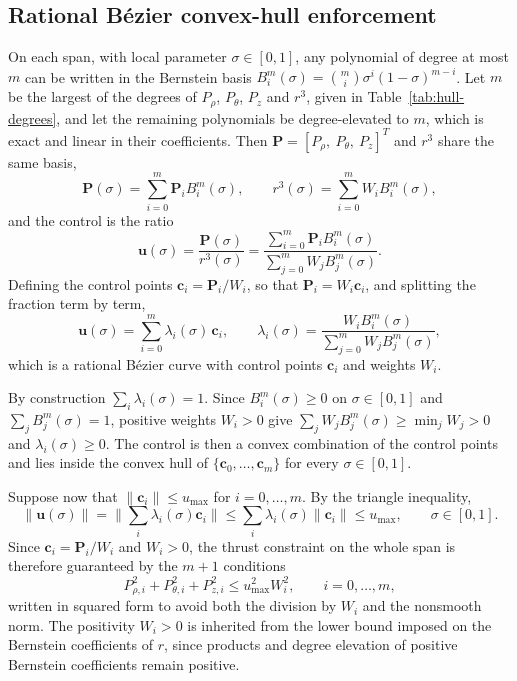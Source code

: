 \documentclass[a4paper,fleqn]{cas-sc}
\begin{document}
\subsection{Rational B\'ezier convex-hull enforcement}
\label{sec:hull}

On each span, with local parameter $\sigma\in[0,1]$, any polynomial of degree
at most $m$ can be written in the Bernstein basis
$B^m_i(\sigma)=\binom{m}{i}\sigma^i(1-\sigma)^{m-i}$. Let $m$ be the largest
of the degrees of $P_\rho$, $P_\theta$, $P_z$ and $r^3$, given in
Table~\ref{tab:hull-degrees}, and let the remaining polynomials be
degree-elevated to $m$, which is exact and linear in their coefficients.
Then $\mathbf{P}=[P_{\rho},\>P_{\theta},\>P_z]^T$ and $r^3$ share the same
basis,
\begin{equation}
	\mathbf{P}(\sigma)=\sum^{m}_{i=0}\mathbf{P}_i B^m_i(\sigma),\qquad
	r^3(\sigma)=\sum^{m}_{i=0}W_i B^m_i(\sigma),
\end{equation}
and the control is the ratio
\begin{equation}
	\mathbf{u}(\sigma)=\dfrac{\mathbf{P}(\sigma)}{r^3(\sigma)}
	=\dfrac{\sum\limits^{m}_{i=0}\mathbf{P}_i B^m_i(\sigma)}
	{\sum\limits^{m}_{j=0}W_j B^m_j(\sigma)}.
\end{equation}
Defining the control points $\mathbf{c}_i=\mathbf{P}_i/W_i$, so that
$\mathbf{P}_i=W_i\mathbf{c}_i$, and splitting the fraction term by term,
\begin{equation}
	\mathbf{u}(\sigma)
	=\sum^{m}_{i=0}\lambda_i(\sigma)\,\mathbf{c}_i,
	\qquad
	\lambda_i(\sigma)=\dfrac{W_i B^m_i(\sigma)}
	{\sum\limits^{m}_{j=0}W_j B^m_j(\sigma)},
	\label{eq:rational-bezier}
\end{equation}
which is a rational B\'ezier curve with control points $\mathbf{c}_i$ and
weights $W_i$.

By construction $\sum_i\lambda_i(\sigma)=1$. Since $B^m_i(\sigma)\geq 0$ on
$\sigma\in[0,1]$ and $\sum_j B^m_j(\sigma)=1$, positive weights $W_i>0$ give
$\sum_j W_jB^m_j(\sigma)\geq\min_j W_j>0$ and $\lambda_i(\sigma)\geq 0$.
The control is then a convex combination of the control points and lies
inside the convex hull of $\{\mathbf{c}_0,\ldots,\mathbf{c}_m\}$ for every
$\sigma\in[0,1]$.

Suppose now that $\lVert\mathbf{c}_i\rVert\leq u_{\max}$ for
$i=0,\ldots,m$. By the triangle inequality,
\begin{equation*}
	\lVert\mathbf{u}(\sigma)\rVert
	=\Big\lVert\sum_i\lambda_i(\sigma)\mathbf{c}_i\Big\rVert
	\leq\sum_i\lambda_i(\sigma)\lVert\mathbf{c}_i\rVert
	\leq u_{\max},
	\qquad \sigma\in[0,1].
\end{equation*}
Since $\mathbf{c}_i=\mathbf{P}_i/W_i$ and $W_i>0$, the thrust constraint on
the whole span is therefore guaranteed by the $m+1$ conditions
\begin{equation}
	P^2_{\rho,i}+P^2_{\theta,i}+P^2_{z,i}\leq u^2_{\max}W^2_i,
	\qquad i=0,\ldots,m,
	\label{eq:hull}
\end{equation}
written in squared form to avoid both the division by $W_i$ and the
nonsmooth norm. The positivity $W_i>0$ is inherited from the lower bound
imposed on the Bernstein coefficients of $r$, since products and degree
elevation of positive Bernstein coefficients remain positive.
\end{document}
